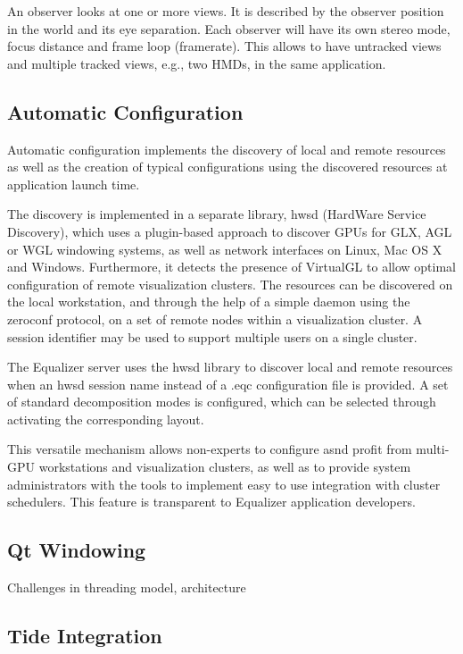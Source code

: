 \documentclass[journal]{vgtc}                %
\begin{document}
An observer looks at one or more views. It is described by the observer position
in the world and its eye separation. Each observer will have its own stereo
mode, focus distance and frame loop (framerate). This allows to have untracked
views and multiple tracked views, e.g., two HMDs, in the same application.

\subsection{Automatic Configuration}

Automatic configuration implements the discovery of local and remote resources
as well as the creation of typical configurations using the discovered resources
at application launch time.

The discovery is implemented in a separate library, hwsd (HardWare Service
Discovery), which uses a plugin-based approach to discover GPUs for GLX, AGL or
WGL windowing systems, as well as network interfaces on Linux, Mac OS X and
Windows. Furthermore, it detects the presence of VirtualGL to allow optimal
configuration of remote visualization clusters. The resources can be discovered
on the local workstation, and through the help of a simple daemon using the
zeroconf protocol, on a set of remote nodes within a visualization cluster. A
session identifier may be used to support multiple users on a single cluster.

The Equalizer server uses the hwsd library to discover local and remote
resources when an hwsd session name instead of a \textsf{.eqc} configuration
file is provided. A set of standard decomposition modes is configured, which can
be selected through activating the corresponding layout.

This versatile mechanism allows non-experts to configure asnd profit from
multi-GPU workstations and visualization clusters, as well as to provide system
administrators with the tools to implement easy to use integration with cluster
schedulers. This feature is transparent to Equalizer application developers.

\subsection{Qt Windowing}

Challenges in threading model, architecture

\subsection{Tide Integration}
\end{document}
